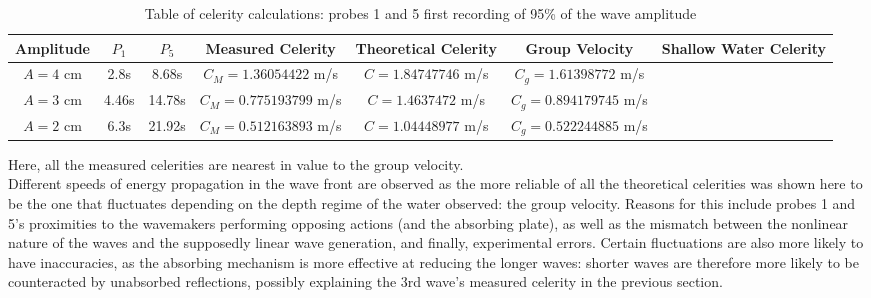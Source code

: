 \documentclass{article}
\begin{document}
	\begin{table}[H]
		\centering
		\begin{tabular}{|c|c|c|c|c|c|c|}
			\hline
			Amplitude & \textbf{$P_1$} & \textbf{$P_5$} & \textbf{Measured Celerity} & Theoretical Celerity & Group Velocity & Shallow Water Celerity\\ \hline
			$A = 4$ cm & 2.8s & 8.68s & $C_M = 1.36054422$ m/s & $C = 1.84747746$ m/s & $C_g = 1.61398772$ m/s &{\multirow{3}{*}{$C_s = 1.98057$ m/s}}\\ \cline{1-6}
			$A = 3$ cm & 4.46s & 14.78s & $C_M = 0.775193799$ m/s & $C = 1.4637472$ m/s & $C_g = 0.894179745$ m/s & {}\\ \cline{1-6}
			$A = 2$ cm & 6.3s & 21.92s & $C_M = 0.512163893$ m/s & $C = 1.04448977$ m/s & $C_g = 0.522244885$ m/s & {} \\ \hline
		\end{tabular}
		\caption{Table of celerity calculations: probes 1 and 5 first recording of 95\% of the wave amplitude}
		\label{largewavefronttable}
	\end{table}
	Here, all the measured celerities are nearest in value to the group velocity.\\
	Different speeds of energy propagation in the wave front are observed as the more reliable of all the theoretical celerities was shown here to be the one that fluctuates depending on the depth regime of the water observed: the group velocity. Reasons for this include probes 1 and 5's proximities to the wavemakers performing opposing actions (and the absorbing plate), as well as the mismatch between the nonlinear nature of the waves and the supposedly linear wave generation, and finally, experimental errors. Certain fluctuations are also more likely to have inaccuracies, as the absorbing mechanism is more effective at reducing the longer waves: shorter waves are therefore more likely to be counteracted by unabsorbed reflections, possibly explaining the 3rd wave's measured celerity in the previous section. 
\end{document}
